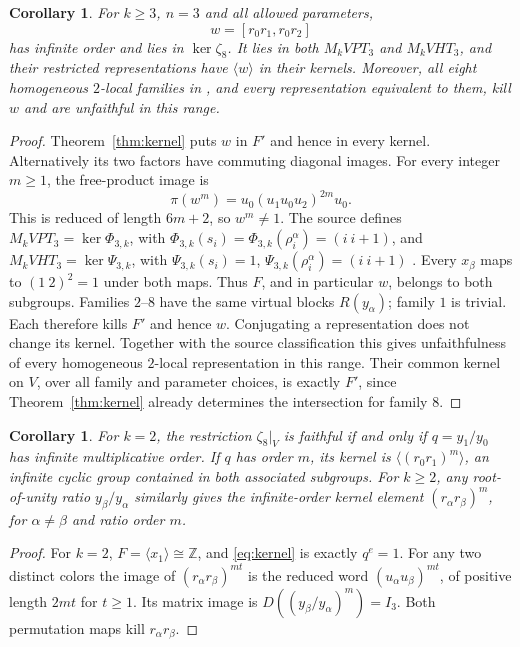 \documentclass[11pt]{article}
\newtheorem{corollary}[theorem]{Corollary}
\begin{document}
\begin{corollary}\label{cor:main}
For $k\ge3$, $n=3$ and all allowed parameters,
\[
 w=[r_0r_1,r_0r_2]
\]
has infinite order and lies in $\ker\zeta_8$. It lies in both
$M_kVPT_3$ and $M_kVHT_3$, and their restricted representations
have $\langle w\rangle$ in their kernels.
Moreover, all eight homogeneous $2$-local families in
\cite[Theorem~4.1]{KMPN}, and every representation equivalent to them,
kill $w$ and are unfaithful in this range.
\end{corollary}
\begin{proof}
Theorem~\ref{thm:kernel} puts $w$ in $F'$ and hence in every kernel.
Alternatively its two factors have commuting diagonal images.
For every integer $m\ge1$, the free-product image is
\[
 \pi(w^m)=u_0(u_1u_0u_2)^{2m}u_0.
\]
This is reduced of length $6m+2$, so $w^m\ne1$.
The source defines $M_kVPT_3=\ker\Phi_{3,k}$, with
$\Phi_{3,k}(s_i)=\Phi_{3,k}(\rho_i^\alpha)=(i\ i+1)$,
and $M_kVHT_3=\ker\Psi_{3,k}$, with
$\Psi_{3,k}(s_i)=1$, $\Psi_{3,k}(\rho_i^\alpha)=(i\ i+1)$
\cite[Sections~3.1--3.2, pp.~6--7, 13]{KMPN}.
Every $x_\beta$ maps to $(1\ 2)^2=1$ under both maps.
Thus $F$, and in particular $w$, belongs to both subgroups.
Families $2$--$8$ have the same virtual blocks $R(y_\alpha)$;
family $1$ is trivial. Each therefore kills $F'$ and hence $w$.
Conjugating a representation does not change its kernel.
Together with the source classification this gives unfaithfulness
of every homogeneous $2$-local representation in this range.
Their common kernel on $V$, over all family and parameter choices,
is exactly $F'$, since Theorem~\ref{thm:kernel} already determines
the intersection for family $8$.
\end{proof}

\begin{corollary}\label{cor:two}
For $k=2$, the restriction $\zeta_8|_V$ is faithful if and only if
$q=y_1/y_0$ has infinite multiplicative order. If $q$ has order $m$,
its kernel is $\langle(r_0r_1)^m\rangle$, an infinite cyclic group
contained in both associated subgroups. For $k\ge2$, any root-of-unity
ratio $y_\beta/y_\alpha$ similarly gives the infinite-order kernel
element $(r_\alpha r_\beta)^m$, for $\alpha\ne\beta$ and ratio order $m$.
\end{corollary}
\begin{proof}
For $k=2$, $F=\langle x_1\rangle\cong\mathbb Z$, and
\eqref{eq:kernel} is exactly $q^e=1$.
For any two distinct colors the image of
$(r_\alpha r_\beta)^{mt}$ is the reduced word
$(u_\alpha u_\beta)^{mt}$, of positive length $2mt$ for $t\ge1$.
Its matrix image is $D((y_\beta/y_\alpha)^m)=I_3$.
Both permutation maps kill $r_\alpha r_\beta$.
\end{proof}
\end{document}
